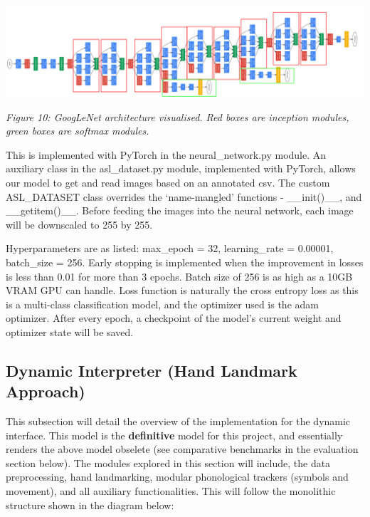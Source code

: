\documentclass[11pt]{article}
\begin{document}
    \begin{center}
        \includegraphics[width=16cm]{images/googlenet.png}
        \\
        \raggedright \textit{
        Figure 10: GoogLeNet architecture visualised. Red boxes are inception modules, green boxes are softmax modules. \cite{gnet}
        }
    \end{center}

    This is implemented with PyTorch in the neural\_network.py module. An auxiliary class in the asl\_dataset.py module, implemented with PyTorch, allows our model to get and read images based on an annotated csv. The custom ASL\_DATASET class overrides the `name-mangled' functions - \_\_init()\_\_, and \_\_getitem()\_\_. Before feeding the images into the neural network, each image will be downscaled to 255 by 255.

    Hyperparameters are as listed: max\_epoch = 32, learning\_rate = 0.00001, batch\_size = 256. Early stopping is implemented when the improvement in losses is less than 0.01 for more than 3 epochs. Batch size of 256 is as high as a 10GB VRAM GPU can handle. Loss function is naturally the cross entropy loss as this is a multi-class classification model, and the optimizer used is the adam optimizer. After every epoch, a checkpoint of the model's current weight and optimizer state will be saved. 

    \subsection{Dynamic Interpreter (Hand Landmark Approach)}
    This subsection will detail the overview of the implementation for the dynamic interface. This model is the \textbf{definitive} model for this project, and essentially renders the above model obselete (see comparative benchmarks in the evaluation section below). The modules explored in this section will include, the data preprocessing, hand landmarking, modular phonological trackers (symbols and movement), and all auxiliary functionalities. This will follow the monolithic structure shown in the diagram below:
\end{document}
